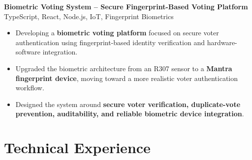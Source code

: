\documentclass[a4paper,11pt]{article}
\newcommand{\resumeItem}[1]{
\item \small{#1 \vspace{-2pt}}
}
\newcommand{\resumeProject}[2]{
\vspace{2pt}
\textbf{#1} \hfill {\small #2}
\vspace{2pt}
}
\begin{document}
\vspace{1mm}

\resumeProject
{Biometric Voting System -- Secure Fingerprint-Based Voting Platform}
{TypeScript, React, Node.js, IoT, Fingerprint Biometrics}

\begin{itemize}[leftmargin=*]

\resumeItem{Developing a \textbf{biometric voting platform} focused on secure voter authentication using fingerprint-based identity verification and hardware-software integration.}

\resumeItem{Upgraded the biometric architecture from an R307 sensor to a \textbf{Mantra fingerprint device}, moving toward a more realistic voter authentication workflow.}

\resumeItem{Designed the system around \textbf{secure voter verification, duplicate-vote prevention, auditability, and reliable biometric device integration}.}

\end{itemize}

\vspace{-8pt}%
\section{Technical Experience}
\end{document}
